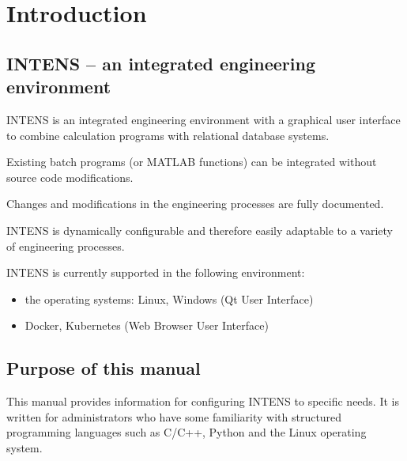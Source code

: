 \newpage
\section{Introduction}
\subsection{INTENS -- an integrated engineering environment}
INTENS
is an integrated engineering environment with a graphical user interface
to combine
calculation programs with relational database systems.

Existing batch programs (or MATLAB functions) can be integrated without source code
modifications.

Changes and modifications in the engineering
processes are fully documented.

INTENS is dynamically configurable and
therefore easily adaptable to a variety of engineering processes.

INTENS is currently supported in the following environment:
\begin{itemize}
\item the operating systems: Linux, Windows (Qt User Interface)
\item Docker, Kubernetes (Web Browser User Interface)
\end{itemize}

\subsection{Purpose of this manual}
This manual provides information for configuring INTENS to specific needs.
It is written for administrators who have some familiarity with structured
programming languages such as C/C++, Python and the Linux operating system.
%
